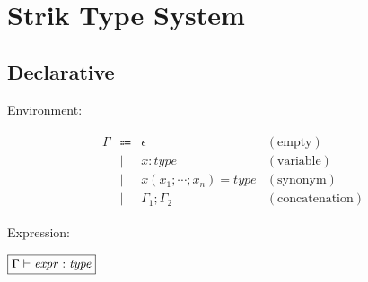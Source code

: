 \section{Strik Type System}

\subsection{Declarative}

Environment:

\begin{align*}
  \begin{array}{rclr}
    \Gamma
    & \Coloneq & \epsilon &(\text{empty}) \\
    & \mid & x: \mathit{type} &(\text{variable}) \\
    & \mid & x(x_1; \cdots; x_n) = \mathit{type} &(\text{synonym}) \\
    & \mid & \Gamma_1; \Gamma_2 &(\text{concatenation})
  \end{array}
\end{align*}

Expression:

$\fbox{$\Gamma \vdash \mathit{expr}: \mathit{type}$}$

